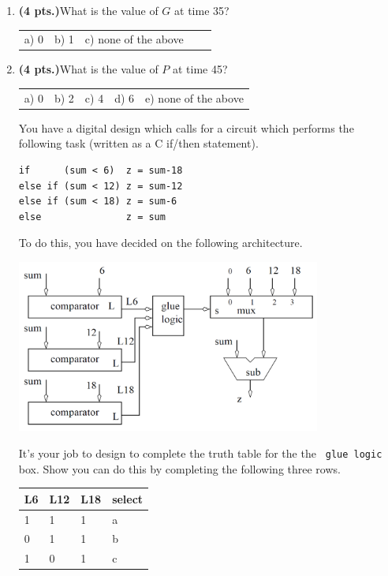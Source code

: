 \documentclass{article}
\begin{document}
\begin{enumerate}
\item {\bf (4 pts.)}What is the value of $G$ at time 35?

\begin{tabular}{p{0.6in} p{0.6in} p{0.6in} p{0.6in} l}
a) 0 & b) 1 & c) none of the above
\end{tabular}

\item {\bf (4 pts.)}What is the value of $P$ at time 45?

\begin{tabular}{p{0.6in} p{0.6in} p{0.6in} p{0.6in} l}
a) 0 & b) 2 & c) 4 & d) 6 & e) none of the above
\end{tabular}


\pagebreak
You have a digital design which calls for a circuit which performs the 
following task (written as a C if/then statement).

\begin{verbatim}
if      (sum < 6)  z = sum-18
else if (sum < 12) z = sum-12
else if (sum < 18) z = sum-6
else               z = sum
\end{verbatim}

To do this, you have decided on the following architecture.

\includegraphics[width=10cm]{./Fig2/if6.png}

It's your job to design to complete the truth table for the 
the \verb+ glue logic+ box.  Show you can do this by completing 
the following three rows.


\begin{tabular}{l|l|l||l}
L6 & L12 & L18 & select \\ \hline
1  & 1   & 1   &   a   \\ \hline
0  & 1   & 1   &   b   \\ \hline
1  & 0   & 1   &   c   \\ 
\end{tabular}


\end{enumerate}
\end{document}
